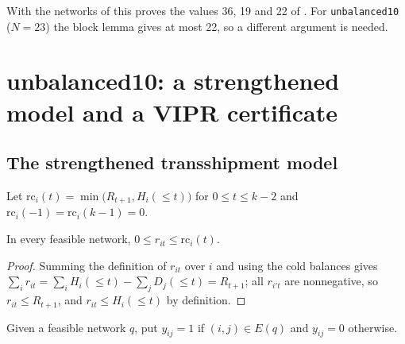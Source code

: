 \documentclass[11pt,a4paper]{report}
\newcommand*{\inst}[1]{\texttt{#1}}
\begin{document}
With the networks of  this proves the values 36, 19 and 22 of . For \inst{unbalanced10}
($N=23$) the block lemma gives at most 22, so a different argument is needed.

\section{unbalanced10: a strengthened model and a VIPR certificate}\label{sec:vipr}

\subsection{The strengthened transshipment model}

Let $\mathrm{rc}_i(t)=\min\bigl(R_{t+1},H_i({\le}t)\bigr)$ for $0\le t\le k-2$ and
$\mathrm{rc}_i(-1)=\mathrm{rc}_i(k-1)=0$.

\begin{lemma}\label{lem:rc}
In every feasible network, $0\le r_{it}\le\mathrm{rc}_i(t)$.
\end{lemma}
\begin{proof}
Summing the definition of $r_{it}$ over $i$ and using the cold balances gives
$\sum_ir_{it}=\sum_iH_i({\le}t)-\sum_jD_j({\le}t)=R_{t+1}$; all $r_{i't}$ are nonnegative, so $r_{it}\le R_{t+1}$,
and $r_{it}\le H_i({\le}t)$ by definition.
\end{proof}

Given a feasible network $q$, put $y_{ij}=1$ if $(i,j)\in E(q)$ and $y_{ij}=0$ otherwise.
\end{document}
